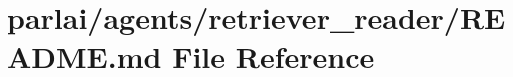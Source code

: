 \hypertarget{parlai_2agents_2retriever__reader_2README_8md}{}\section{parlai/agents/retriever\+\_\+reader/\+R\+E\+A\+D\+ME.md File Reference}
\label{parlai_2agents_2retriever__reader_2README_8md}
